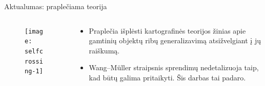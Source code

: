 \documentclass[14pt]{beamer}
\newcommand{\WM}{Wang--M{\"u}ller}
\begin{document}
\begin{frame}[fragile]{Aktualumas: praplečiama teorija}
  \begin{columns}[c]
    \begin{column}{.3\textwidth}
      \begin{figure}[ht]
        \texttt{[image: selfcrossing-1]}
      \end{figure}
    \end{column}
    \begin{column}{.7\textwidth}
      \begin{itemize}

        \item Praplečia išplėsti kartografinės teorijos žinias apie gamtinių
          objektų ribų generalizavimą atsižvelgiant į jų raiškumą.

        \item {\WM} straipsnis sprendimų nedetalizuoja taip, kad būtų
          galima pritaikyti. Šis darbas tai padaro.

      \end{itemize}
    \end{column}
  \end{columns}
\end{frame}
\end{document}
